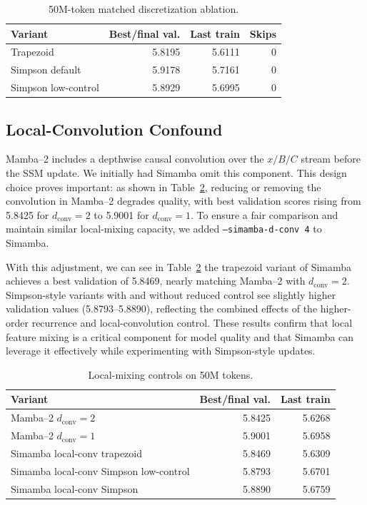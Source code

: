\documentclass[conference]{IEEEtran}
\newcommand{\modelname}{Simamba\xspace}
\newcommand{\mambatwo}{Mamba--2\xspace}
\begin{document}
\begin{table}[t]
\caption{50M-token matched discretization ablation.}
\label{tab:ablation50}
\centering
\begin{tabular}{lrrr}
\toprule
Variant & Best/final val. & Last train & Skips\\
\midrule
Trapezoid & 5.8195 & 5.6111 & 0\\
Simpson default & 5.9178 & 5.7161 & 0\\
Simpson low-control & 5.8929 & 5.6995 & 0\\
\bottomrule
\end{tabular}
\end{table}

\subsection{Local-Convolution Confound}

\mambatwo includes a depthwise causal convolution over the $x/B/C$ stream before the SSM update. We initially had \modelname omit this component. This design choice proves important: as shown in Table~\ref{tab:local}, reducing or removing the convolution in \mambatwo degrades quality, with best validation scores rising from 5.8425 for \(d_{\mathrm{conv}}=2\) to 5.9001 for \(d_{\mathrm{conv}}=1\). To ensure a fair comparison and maintain similar local-mixing capacity, we added \texttt{--simamba-d-conv 4} to \modelname.

With this adjustment, we can see in Table~\ref{tab:local} the trapezoid variant of \modelname achieves a best validation of 5.8469, nearly matching \mambatwo with \(d_{\mathrm{conv}}=2\). Simpson-style variants with and without reduced control see slightly higher validation values (5.8793–5.8890), reflecting the combined effects of the higher-order recurrence and local-convolution control. These results confirm that local feature mixing is a critical component for model quality and that \modelname can leverage it effectively while experimenting with Simpson-style updates.

\begin{table}[t]
\caption{Local-mixing controls on 50M tokens.}
\label{tab:local}
\centering
\begin{tabular}{lrr}
\toprule
Variant & Best/final val. & Last train\\
\midrule
\mambatwo{} $d_{\mathrm{conv}}=2$ & 5.8425 & 5.6268\\
\mambatwo{} $d_{\mathrm{conv}}=1$ & 5.9001 & 5.6958\\
\modelname{} local-conv trapezoid & 5.8469 & 5.6309\\
\modelname{} local-conv Simpson low-control & 5.8793 & 5.6701\\
\modelname{} local-conv Simpson & 5.8890 & 5.6759\\
\bottomrule
\end{tabular}
\end{table}
\end{document}
